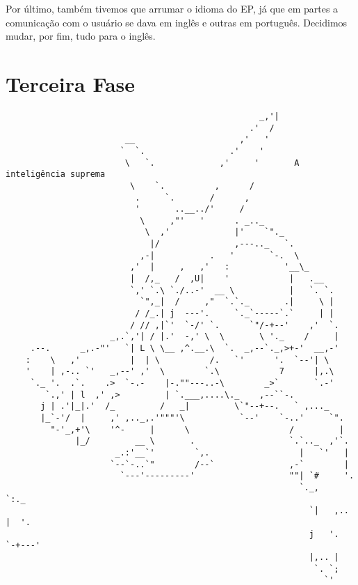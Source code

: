 \documentclass[a4paper]{article}
\begin{document}
   Por último, também tivemos que arrumar o idioma do EP, já que em partes a comunicação com
o usuário se dava em inglês e outras em português. Decidimos mudar, por fim, tudo para o inglês.

\newpage
\section{Terceira Fase}

\begin{verbatim}
                                                   _,'|
                                                 .'  /
                        __                     ,'   '
                       `  `.                 .'    '
                        \   `.             ,'     '       A inteligência suprema
                         \    `.          ,      /
                          .     `.       /      ,
                          '       ..__../'     /
                           \     ,"'   '      . _.._
                            \  ,'             |'    `"._
                             |/               ,---.._   `.
                           ,-|           .   '       `-.  \
                         ,'  |     ,   ,'   :           '__\_
                         |  /,_   /  ,U|    '            |   .__
                         `,' `.\ `./..-'  __ \           |   `. `.
                           `",_|  /     ,"  `.`._       .|     \ |
                          / /_.| j  ---'.     `._`-----`.`     | |
                         / // ,|`'  `-/' `.      `"/-+--'    ,'  `.
                     _,.`,'| / |.'  -,' \  \       \ '._    /     |
     .--.      _,.-"'   `| L \ \__ ,^.__.\  `.  _,--`._,>+-'  __,-'
    :    \   ,'          |  | \          /.   `'      '.  `--'| \
    '    | ,-.. `'   _,--' ,'  \        `.\            7      |,.\
     `._ '.  .`.    .>  `-.-    |-.""---..-\        _>`       `.-'
        `.,' | l  ,' ,>         | `.___,....\._    ,--``-.
       j | .'|_|.'  /_         /   _|         \`"--+--.   ` ,..._
       |_`-'/  |     ,' ,.._,.'"""'\           `--'    `-..'     `".
         "-'_,+'\    '^-     |      \                    /         |
              |_/         __ \       .                   `.`.._  ,'`.
                      _.:'__`'        `,.                  |   `'   |
                     `--`-..`"        /--`               ,-`        |
                       `---'---------'                   ""| `#     '.
                                                           `._,       `:._
                                                             `|   ,..  |  '.
                                                             j   '.  `-+---'
                                                             |,.. |
                                                              `. `;
                                                                `' 
\end{verbatim}
\end{document}
